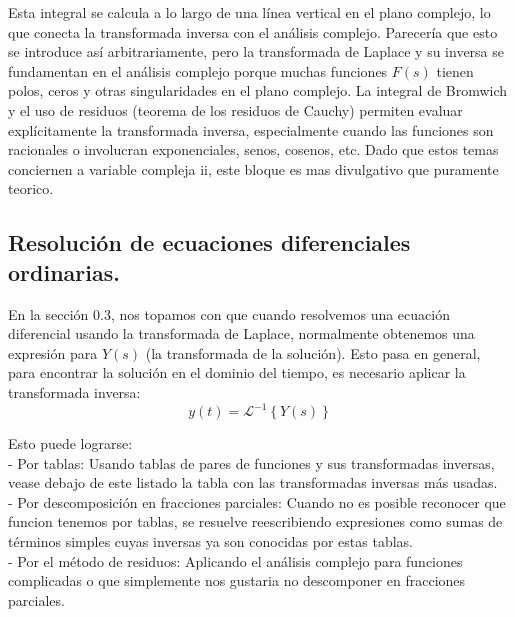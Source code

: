 \documentclass{article}
\theoremstyle{nonumberplain}
\begin{document}
Esta integral se calcula a lo largo de una línea vertical en el plano complejo, lo que conecta la transformada inversa con el análisis complejo. Parecería que esto se introduce así arbitrariamente, pero la transformada de Laplace y su inversa se fundamentan en el análisis complejo porque muchas funciones \( F(s) \) tienen polos, ceros y otras singularidades en el plano complejo. La integral de Bromwich y el uso de residuos (teorema de los residuos de Cauchy) permiten evaluar explícitamente la transformada inversa, especialmente cuando las funciones son racionales o involucran exponenciales, senos, cosenos, etc. Dado que estos temas conciernen a variable compleja ii, este bloque es mas divulgativo que puramente teorico.

\subsection{Resolución de ecuaciones diferenciales ordinarias.}

En la sección 0.3, nos topamos con que cuando resolvemos una ecuación diferencial usando la transformada de Laplace, normalmente obtenemos una expresión para \( Y(s) \) (la transformada de la solución). Esto pasa en general, para encontrar la solución en el dominio del tiempo, es necesario aplicar la transformada inversa:
\[
y(t) = \mathcal{L}^{-1}\left\{Y(s)\right\}
\]

Esto puede lograrse: \\
- Por tablas: Usando tablas de pares de funciones y sus transformadas inversas, vease debajo de este listado la tabla con las transformadas inversas más usadas.\\
- Por descomposición en fracciones parciales: Cuando no es posible reconocer que funcion tenemos por tablas, se resuelve reescribiendo expresiones como sumas de términos simples cuyas inversas ya son conocidas por estas tablas.\\
- Por el método de residuos: Aplicando el análisis complejo para funciones complicadas o que simplemente nos gustaria no descomponer en fracciones parciales.\\
\end{document}
